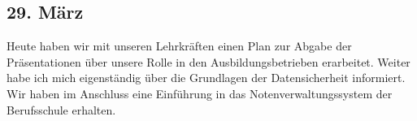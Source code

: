 \subsection{29. März}
Heute haben wir mit unseren Lehrkräften einen Plan zur Abgabe der Präsentationen über unsere Rolle in den Ausbildungsbetrieben erarbeitet. Weiter habe ich mich eigenständig über die Grundlagen der Datensicherheit informiert. Wir haben im Anschluss eine Einführung in das Notenverwaltungssystem der Berufsschule erhalten.
